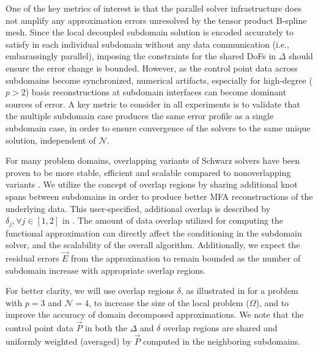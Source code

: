 One of the key metrics of interest is that the parallel solver infrastructure does not amplify any approximation errors unresolved by the tensor product B-spline mesh. Since the local decoupled subdomain solution is encoded accurately to satisfy  in each individual subdomain without any data communication (i.e., embarassingly parallel), imposing the constraints for the shared DoFs in $\Delta$ should ensure the error change is bounded. However, as the control point data across subdomains become synchronized, numerical artifacts, especially for high-degree ($p>2$) basis reconstructions at subdomain interfaces can become dominant sources of error. A key metric to consider in all experiments is to validate that the multiple subdomain case produces the same error profile as a single subdomain case, in order to ensure convergence of the solvers to the same unique solution, independent of $\mathcal{N}$. %


For many problem domains, overlapping variants of Schwarz solvers \cite{lions-asm, gander-rasm} have been proven to be more stable, efficient and scalable compared to nonoverlapping variants \cite{bjorstad-overlap-1989, orasm-as-ms-2007}. We utilize the concept of overlap regions by sharing additional knot spans between subdomains in order to produce better MFA reconstructions of the underlying data. This user-specified, additional overlap is described by $\delta_j, \forall j \in [1,2]$ in . The amount of data overlap utilized for computing the functional approximation can directly affect the conditioning in the subdomain solver, and the scalability of the overall algorithm. Additionally, we expect the residual errors $\vec{E}$ from the approximation to remain bounded as the number of subdomain increase with appropriate overlap regions. %

For better clarity, we will use overlap regions $\delta$, as illustrated in  for a  problem with $p=3$ and $\mathcal{N}=4$, to increase the size of the local problem ($\Omega$), and to improve the accuracy of domain decomposed approximations. We note that the control point data $\vec{P}$ in both the $\Delta$ and $\delta$ overlap regions are shared and uniformly weighted (averaged) by $\vec{P}$ computed in the neighboring subdomains.

